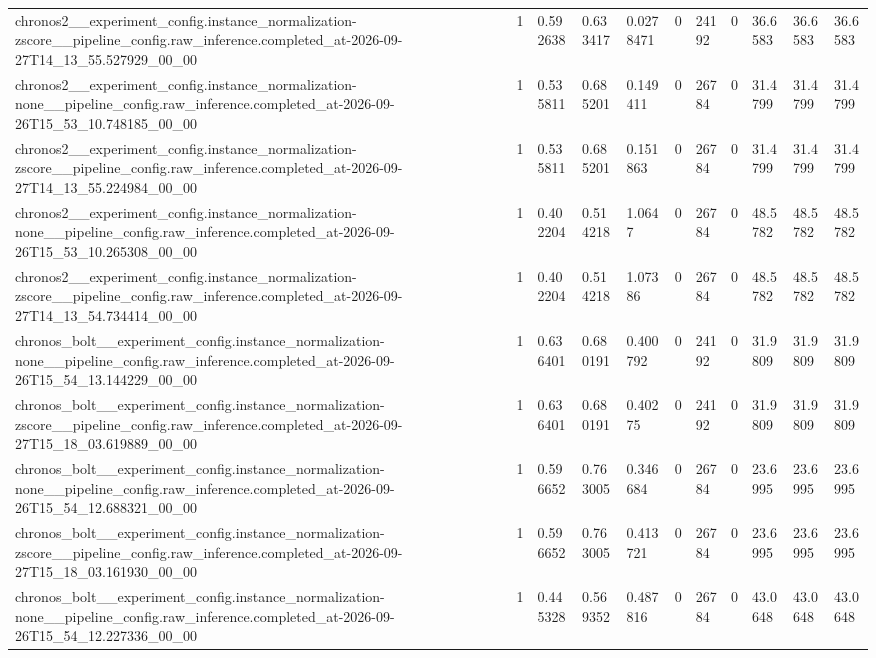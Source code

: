 \begin{tabular}{lllllllllll}
chronos2\_\_experiment\_config.instance\_normalization-zscore\_\_pipeline\_config.raw\_inference.completed\_at-2026-09-27T14\_13\_55.527929\_00\_00 & 1 & 0.592638 & 0.633417 & 0.0278471 & 0 & 24192 & 0 & 36.6583 & 36.6583 & 36.6583 \\
chronos2\_\_experiment\_config.instance\_normalization-none\_\_pipeline\_config.raw\_inference.completed\_at-2026-09-26T15\_53\_10.748185\_00\_00 & 1 & 0.535811 & 0.685201 & 0.149411 & 0 & 26784 & 0 & 31.4799 & 31.4799 & 31.4799 \\
chronos2\_\_experiment\_config.instance\_normalization-zscore\_\_pipeline\_config.raw\_inference.completed\_at-2026-09-27T14\_13\_55.224984\_00\_00 & 1 & 0.535811 & 0.685201 & 0.151863 & 0 & 26784 & 0 & 31.4799 & 31.4799 & 31.4799 \\
chronos2\_\_experiment\_config.instance\_normalization-none\_\_pipeline\_config.raw\_inference.completed\_at-2026-09-26T15\_53\_10.265308\_00\_00 & 1 & 0.402204 & 0.514218 & 1.0647 & 0 & 26784 & 0 & 48.5782 & 48.5782 & 48.5782 \\
chronos2\_\_experiment\_config.instance\_normalization-zscore\_\_pipeline\_config.raw\_inference.completed\_at-2026-09-27T14\_13\_54.734414\_00\_00 & 1 & 0.402204 & 0.514218 & 1.07386 & 0 & 26784 & 0 & 48.5782 & 48.5782 & 48.5782 \\
chronos\_bolt\_\_experiment\_config.instance\_normalization-none\_\_pipeline\_config.raw\_inference.completed\_at-2026-09-26T15\_54\_13.144229\_00\_00 & 1 & 0.636401 & 0.680191 & 0.400792 & 0 & 24192 & 0 & 31.9809 & 31.9809 & 31.9809 \\
chronos\_bolt\_\_experiment\_config.instance\_normalization-zscore\_\_pipeline\_config.raw\_inference.completed\_at-2026-09-27T15\_18\_03.619889\_00\_00 & 1 & 0.636401 & 0.680191 & 0.40275 & 0 & 24192 & 0 & 31.9809 & 31.9809 & 31.9809 \\
chronos\_bolt\_\_experiment\_config.instance\_normalization-none\_\_pipeline\_config.raw\_inference.completed\_at-2026-09-26T15\_54\_12.688321\_00\_00 & 1 & 0.596652 & 0.763005 & 0.346684 & 0 & 26784 & 0 & 23.6995 & 23.6995 & 23.6995 \\
chronos\_bolt\_\_experiment\_config.instance\_normalization-zscore\_\_pipeline\_config.raw\_inference.completed\_at-2026-09-27T15\_18\_03.161930\_00\_00 & 1 & 0.596652 & 0.763005 & 0.413721 & 0 & 26784 & 0 & 23.6995 & 23.6995 & 23.6995 \\
chronos\_bolt\_\_experiment\_config.instance\_normalization-none\_\_pipeline\_config.raw\_inference.completed\_at-2026-09-26T15\_54\_12.227336\_00\_00 & 1 & 0.445328 & 0.569352 & 0.487816 & 0 & 26784 & 0 & 43.0648 & 43.0648 & 43.0648 \\

\end{tabular}
